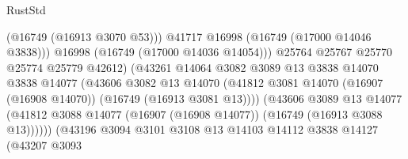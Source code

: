 \begin{lexlean}{RustStd}
\begin{coremodule}
                                                (@16749 (@16913 @3070 @53)))
                                              @41717
                                              @16998
                                              (@16749 (@17000 @14046 @3838)))
                                            @16998
                                            (@16749 (@17000 @14036 @14054)))
                                          @25764
                                          @25767
                                          @25770
                                          @25774
                                          @25779
                                          @42612)
                                        (@43261
                                          @14064
                                          @3082
                                          @3089
                                          @13
                                          @3838
                                          @14070
                                          @3838
                                          @14077
                                          (@43606
                                            @3082
                                            @13
                                            @14070
                                            (@41812
                                              @3081
                                              @14070
                                              (@16907 (@16908 @14070))
                                              (@16749 (@16913 @3081 @13))))
                                          (@43606
                                            @3089
                                            @13
                                            @14077
                                            (@41812
                                              @3088
                                              @14077
                                              (@16907 (@16908 @14077))
                                              (@16749 (@16913 @3088 @13))))))
                                      (@43196
                                        @3094
                                        @3101
                                        @3108
                                        @13
                                        @14103
                                        @14112
                                        @3838
                                        @14127
                                        (@43207
                                          @3093

\end{coremodule}
\end{lexlean}
